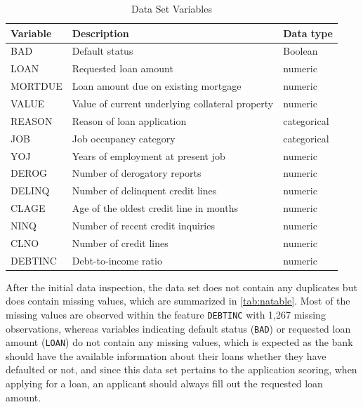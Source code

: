 \begin{table}[H]
\small
\setlength{\tabcolsep}{8pt}
\renewcommand{\arraystretch}{1.3}
\centering
\caption[Data Set Variables]{Data Set Variables}\label{tab:dataset}
\begin{tabular}{@{} l p{8cm} l @{}}
\toprule
\textbf{Variable} & \textbf{Description} & \textbf{Data type}\\
\midrule
\hline
BAD & Default status & Boolean \\

LOAN & Requested loan amount & numeric \\

MORTDUE & Loan amount due on existing mortgage & numeric \\

VALUE & Value of current underlying collateral property & numeric \\

REASON & Reason of loan application & categorical \\
JOB & Job occupancy category & categorical \\

YOJ & Years of employment at present job & numeric \\

DEROG & Number of derogatory reports & numeric \\

DELINQ & Number of delinquent credit lines & numeric \\

CLAGE & Age of the oldest credit line in months & numeric \\

NINQ & Number of recent credit inquiries & numeric \\

CLNO & Number of credit lines & numeric \\

DEBTINC & Debt-to-income ratio & numeric \\
\hline
\bottomrule
\end{tabular}
\vspace{0.35em}

\vspace{-1em}
\end{table}

After the initial data inspection, the data set does not contain any duplicates but does contain missing values, which are summarized in \autoref{tab:natable}.
Most of the missing values are observed within the feature \texttt{DEBTINC} with 1,267 missing observations,
whereas variables indicating default status (\texttt{BAD}) or requested loan amount (\texttt{LOAN}) do not contain any missing values, which is expected as the bank should have the available information about their loans whether they have defaulted or not, and since this data set pertains to the application scoring, when applying for a loan, an applicant should always fill out the requested loan amount.

